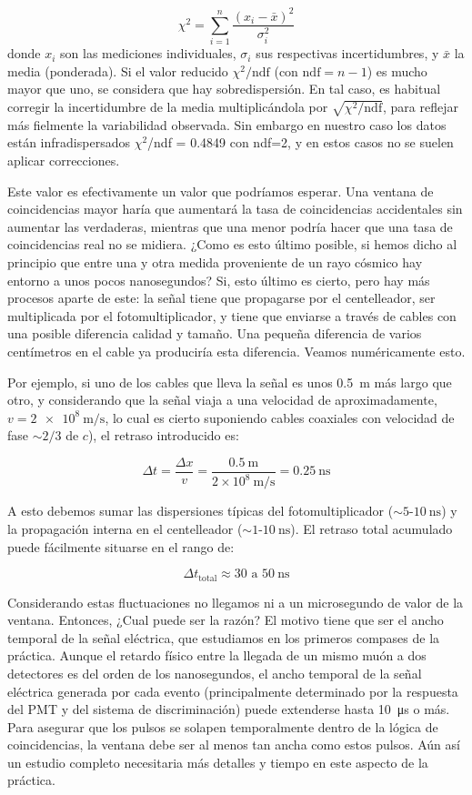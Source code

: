\documentclass[11pt]{article}
\begin{document}
\begin{equation}
\chi^2 = \sum_{i=1}^{n} \frac{(x_i - \bar{x})^2}{\sigma_i^2}
\end{equation}
donde \(x_i\) son las mediciones individuales, \(\sigma_i\) sus respectivas incertidumbres, y \(\bar{x}\) la media (ponderada). Si el valor reducido \(\chi^2/\text{ndf}\) (con \(\text{ndf} = n - 1\)) es mucho mayor que uno, se considera que hay sobredispersión. En tal caso, es habitual corregir la incertidumbre de la media multiplicándola por \(\sqrt{\chi^2/\text{ndf}}\), para reflejar más fielmente la variabilidad observada. Sin embargo en nuestro caso los datos están infradispersados $\chi^2$/ndf = 0.4849 con ndf=2, y en estos casos no se suelen aplicar correcciones. 
 
Este valor es efectivamente un valor que podríamos esperar. Una ventana de coincidencias mayor haría que aumentará la tasa de coincidencias accidentales sin aumentar las verdaderas, mientras que una menor podría hacer que una tasa de coincidencias real no se midiera. ¿Como es esto último posible, si hemos dicho al principio que entre una y otra medida proveniente de un rayo cósmico hay entorno a unos pocos nanosegundos? Si, esto último es cierto, pero  hay más procesos aparte de este: la señal tiene que propagarse por el centelleador, ser multiplicada por el fotomultiplicador, y tiene que enviarse a través de cables con una posible diferencia calidad y tamaño. Una pequeña diferencia de varios centímetros en el cable ya produciría esta diferencia. Veamos numéricamente esto.

Por ejemplo, si uno de los cables que lleva la señal es unos \SI{0.5}{\meter} más largo que otro, y considerando que la señal viaja a una velocidad de aproximadamente, \( v = \SI{2e8}{\meter/\second} \), lo cual es cierto suponiendo cables coaxiales con velocidad de fase \(\sim 2/3\) de \(c\)), el retraso introducido es:

\[
\Delta t = \frac{\Delta x}{v} = \frac{0.5~\text{m}}{2 \times 10^8~\text{m/s}} = 0.25~\text{ns}
\]

A esto debemos sumar las dispersiones típicas del fotomultiplicador (\(\sim 5\)-\(10~\text{ns}\)) y la propagación interna en el centelleador (\(\sim 1\)-\(10~\text{ns}\)). El retraso total acumulado puede fácilmente situarse en el rango de:

\[
\Delta t_{\text{total}} \approx 30\text{ a }50~\text{ns}
\]

Considerando estas fluctuaciones no llegamos ni a un microsegundo de valor de la ventana. Entonces, ¿Cual puede ser la razón? El motivo tiene que ser el ancho temporal de la señal eléctrica, que estudiamos en los primeros compases de la práctica. Aunque el retardo físico entre la llegada de un mismo muón a dos detectores es del orden de los nanosegundos, el ancho temporal de la señal eléctrica generada por cada evento (principalmente determinado por la respuesta del PMT y del sistema de discriminación) puede extenderse hasta \SI{10}{\micro\second} o más. Para asegurar que los pulsos se solapen temporalmente dentro de la lógica de coincidencias, la ventana debe ser al menos tan ancha como estos pulsos. Aún así un estudio completo necesitaria más detalles y tiempo en este aspecto de la práctica.
\end{document}
